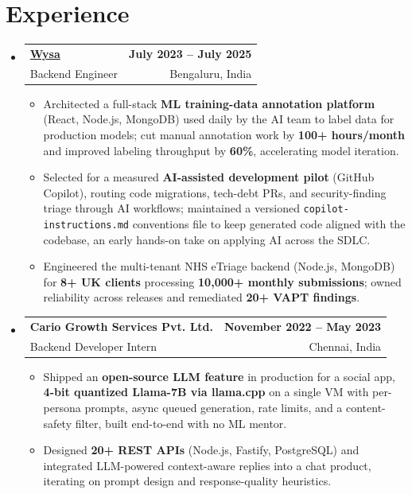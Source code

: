 \documentclass[letterpaper,10pt]{article}
\makeatletter
\newcommand{\resumeItem}[1]{
  \item\small{#1\vspace{-1pt}}
}
\newcommand{\resumeSubheading}[4]{
  \vspace{1pt}\item
    \begin{tabular*}{0.985\textwidth}[t]{l@{\extracolsep{\fill}}r}
      \textbf{#1} & \textbf{\small #2} \\
      {\small\color{ResumeSlate} #3} & {\small\color{ResumeSlate} #4} \\
    \end{tabular*}\vspace{-6pt}
}
\newcommand{\resumeSubHeadingListStart}{\begin{itemize}[leftmargin=0.0in, label={}, itemsep=2pt, topsep=2pt]}
\newcommand{\resumeSubHeadingListEnd}{\end{itemize}}
\newcommand{\resumeItemListStart}{\begin{itemize}[leftmargin=0.18in, itemsep=2pt, topsep=1pt]}
\newcommand{\resumeItemListEnd}{\end{itemize}\vspace{-4pt}}
\makeatother
\begin{document}
\section{Experience}
\resumeSubHeadingListStart
  \resumeSubheading
    {\href{https://www.wysa.io}{Wysa}}{July 2023 -- July 2025}
    {Backend Engineer}{Bengaluru, India}
    \resumeItemListStart
      \resumeItem{Architected a full-stack \textbf{ML training-data annotation platform} (React, Node.js, MongoDB) used daily by the AI team to label data for production models; cut manual annotation work by \textbf{100+ hours/month} and improved labeling throughput by \textbf{60\%}, accelerating model iteration.}
      \resumeItem{Selected for a measured \textbf{AI-assisted development pilot} (GitHub Copilot), routing code migrations, tech-debt PRs, and security-finding triage through AI workflows; maintained a versioned \texttt{copilot-instructions.md} conventions file to keep generated code aligned with the codebase, an early hands-on take on applying AI across the SDLC.}
      \resumeItem{Engineered the multi-tenant NHS eTriage backend (Node.js, MongoDB) for \textbf{8+ UK clients} processing \textbf{10{,}000+ monthly submissions}; owned reliability across releases and remediated \textbf{20+ VAPT findings}.}
    \resumeItemListEnd
  \resumeSubheading
    {Cario Growth Services Pvt. Ltd.}{November 2022 -- May 2023}
    {Backend Developer Intern}{Chennai, India}
    \resumeItemListStart
      \resumeItem{Shipped an \textbf{open-source LLM feature} in production for a social app, \textbf{4-bit quantized Llama-7B via llama.cpp} on a single VM with per-persona prompts, async queued generation, rate limits, and a content-safety filter, built end-to-end with no ML mentor.}
      \resumeItem{Designed \textbf{20+ REST APIs} (Node.js, Fastify, PostgreSQL) and integrated LLM-powered context-aware replies into a chat product, iterating on prompt design and response-quality heuristics.}
    \resumeItemListEnd
\resumeSubHeadingListEnd
\vspace{-4pt}
\end{document}
